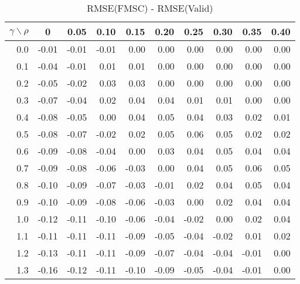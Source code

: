 \documentclass[12pt]{article}
\begin{document}
%
\begin{table}[!tbp]
\caption{RMSE(FMSC) - RMSE(Valid)}
 \begin{center}
 \begin{tabular}{r|rrrrrrrrr}\hline\hline
\multicolumn{1}{c|}{$\gamma\backslash\rho$}&\multicolumn{1}{c}{0}&\multicolumn{1}{c}{0.05}&\multicolumn{1}{c}{0.10}&\multicolumn{1}{c}{0.15}&\multicolumn{1}{c}{0.20}&\multicolumn{1}{c}{0.25}&\multicolumn{1}{c}{0.30}&\multicolumn{1}{c}{0.35}&\multicolumn{1}{c}{0.40}\tabularnewline
\hline
0.0&-0.01&-0.01&-0.01& 0.00& 0.00& 0.00& 0.00& 0.00&0.00\tabularnewline
0.1&-0.04&-0.01& 0.01& 0.01& 0.00& 0.00& 0.00& 0.00&0.00\tabularnewline
0.2&-0.05&-0.02& 0.03& 0.03& 0.00& 0.00& 0.00& 0.00&0.00\tabularnewline
0.3&-0.07&-0.04& 0.02& 0.04& 0.04& 0.01& 0.01& 0.00&0.00\tabularnewline
0.4&-0.08&-0.05& 0.00& 0.04& 0.05& 0.04& 0.03& 0.02&0.01\tabularnewline
0.5&-0.08&-0.07&-0.02& 0.02& 0.05& 0.06& 0.05& 0.02&0.02\tabularnewline
0.6&-0.09&-0.08&-0.04& 0.00& 0.03& 0.04& 0.05& 0.04&0.04\tabularnewline
0.7&-0.09&-0.08&-0.06&-0.03& 0.00& 0.04& 0.05& 0.06&0.05\tabularnewline
0.8&-0.10&-0.09&-0.07&-0.03&-0.01& 0.02& 0.04& 0.05&0.04\tabularnewline
0.9&-0.10&-0.09&-0.08&-0.06&-0.03& 0.00& 0.02& 0.04&0.04\tabularnewline
1.0&-0.12&-0.11&-0.10&-0.06&-0.04&-0.02& 0.00& 0.02&0.04\tabularnewline
1.1&-0.11&-0.11&-0.11&-0.09&-0.05&-0.04&-0.02& 0.01&0.02\tabularnewline
1.2&-0.13&-0.11&-0.11&-0.09&-0.07&-0.04&-0.04&-0.01&0.00\tabularnewline
1.3&-0.16&-0.12&-0.11&-0.10&-0.09&-0.05&-0.04&-0.01&0.00\tabularnewline
\hline
\end{tabular}

\end{center}

\end{table}
\end{document}
